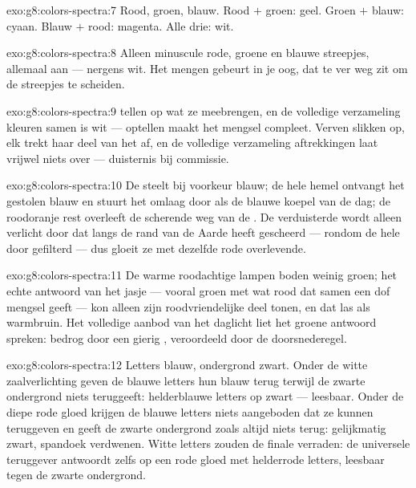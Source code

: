 \begin{solution}{exo:g8:colors-spectra:7}
Rood, groen, blauw. Rood $+$ groen: geel. Groen $+$ blauw: cyaan.
Blauw $+$ rood: magenta. Alle drie: wit.
\end{solution}

\begin{solution}{exo:g8:colors-spectra:8}
Alleen minuscule rode, groene en blauwe streepjes, allemaal aan ---
nergens wit. Het mengen gebeurt in je oog, dat te ver weg zit om de
streepjes te scheiden.
\end{solution}

\begin{solution}{exo:g8:colors-spectra:9}
 tellen op wat ze meebrengen, en de volledige verzameling
kleuren samen is wit --- optellen maakt het mengsel compleet. Verven
slikken op, elk trekt haar deel van het  af, en de
volledige verzameling aftrekkingen laat vrijwel niets over ---
duisternis bij commissie.
\end{solution}

\begin{solution}{exo:g8:colors-spectra:10}
De  steelt bij voorkeur blauw; de hele hemel ontvangt het
gestolen blauw en stuurt het omlaag door als de blauwe koepel van de
dag; de roodoranje rest overleeft de scherende weg van de
. De verduisterde  wordt alleen
verlicht door  dat langs de rand van de Aarde heeft
gescheerd --- rondom de hele  door 
gefilterd --- dus gloeit ze met dezelfde rode overlevende.
\end{solution}

\begin{solution}{exo:g8:colors-spectra:11}
De warme roodachtige lampen boden weinig groen; het echte antwoord van
het jasje --- vooral groen met wat rood dat samen een dof mengsel geeft
--- kon alleen zijn roodvriendelijke deel tonen, en dat las als
warmbruin. Het volledige aanbod van het daglicht liet het groene
antwoord spreken: bedrog door een gierig , veroordeeld door
de doorsnederegel.
\end{solution}

\begin{solution}{exo:g8:colors-spectra:12}
Letters blauw, ondergrond zwart. Onder de witte zaalverlichting geven
de blauwe letters hun blauw terug terwijl de zwarte ondergrond niets
teruggeeft: helderblauwe letters op zwart --- leesbaar. Onder de diepe
rode gloed krijgen de blauwe letters niets aangeboden dat ze kunnen
teruggeven en geeft de zwarte ondergrond zoals altijd niets terug:
gelijkmatig zwart, spandoek verdwenen. Witte letters zouden de finale
verraden: de universele teruggever antwoordt zelfs op een rode gloed
met helderrode letters, leesbaar tegen de zwarte ondergrond.
\end{solution}

